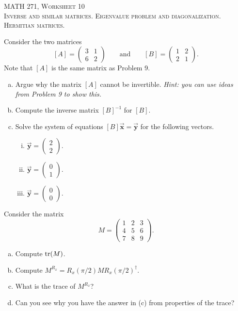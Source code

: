 \documentclass[12pt]{article} %
\begin{document}
\begin{center}
   \textsc{\large MATH 271, Worksheet 10}\\
   \textsc{Inverse and similar matrices. Eigenvalue problem and diagonalization. Hermitian matrices.}
\end{center}
\vspace{.5cm}


\begin{problem}
Consider the two matrices 
\[
[A] = \begin{pmatrix} 3 & 1 \\ 6 & 2 \end{pmatrix} \qquad \textrm{and} \qquad [B] = \begin{pmatrix} 1 & 2\\ 2 & 1 \end{pmatrix}.
\]
Note that $[A]$ is the same matrix as Problem 9.
\begin{enumerate}[(a)]
    \item Argue why the matrix $[A]$ cannot be invertible. \emph{Hint: you can use ideas from Problem 9 to show this.}
    \item Compute the inverse matrix $[B]^{-1}$ for $[B]$.  
    \item Solve the system of equations $[B]\vec{\boldsymbol{x}} = \vec{\boldsymbol{y}}$ for the following vectors.
    \begin{enumerate}[i.]
        \item $\vec{\boldsymbol{y}} = \begin{pmatrix} 2 \\ 2 \end{pmatrix}$.
        \item $\vec{\boldsymbol{y}} = \begin{pmatrix} 0 \\ 1 \end{pmatrix}$.
        \item $\vec{\boldsymbol{y}} = \begin{pmatrix} 0 \\ 0 \end{pmatrix}$.
    \end{enumerate}
\end{enumerate}
\end{problem}

\begin{problem}
Consider the matrix 
\[
M = \begin{pmatrix} 1 & 2 & 3 \\ 4 & 5 & 6 \\ 7 & 8 & 9 \end{pmatrix}.
\]
\begin{enumerate}[(a)]
    \item Compute $\mathrm{tr}(M)$. 
    \item Compute $M^{R_x}=R_x(\pi/2)MR_x(\pi/2)^\dagger$.
    \item What is the trace of $M^{R_x}$?
    \item Can you see why you have the answer in (c) from properties of the trace?
\end{enumerate}
\end{problem}
\end{document}
